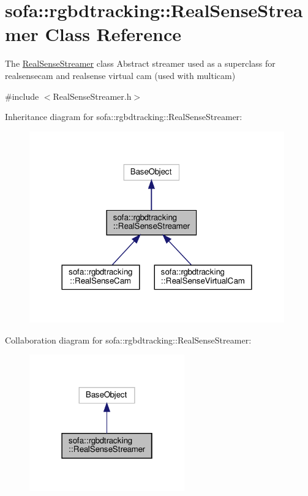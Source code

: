 \hypertarget{classsofa_1_1rgbdtracking_1_1_real_sense_streamer}{}\section{sofa\+:\+:rgbdtracking\+:\+:Real\+Sense\+Streamer Class Reference}
\label{classsofa_1_1rgbdtracking_1_1_real_sense_streamer}


The \hyperlink{classsofa_1_1rgbdtracking_1_1_real_sense_streamer}{Real\+Sense\+Streamer} class Abstract streamer used as a superclass for realsensecam and realsense virtual cam (used with multicam)  




{\ttfamily \#include $<$Real\+Sense\+Streamer.\+h$>$}



Inheritance diagram for sofa\+:\+:rgbdtracking\+:\+:Real\+Sense\+Streamer\+:
\nopagebreak
\begin{figure}[H]
\begin{center}
\leavevmode
\includegraphics[width=312pt]{classsofa_1_1rgbdtracking_1_1_real_sense_streamer__inherit__graph}
\end{center}
\end{figure}


Collaboration diagram for sofa\+:\+:rgbdtracking\+:\+:Real\+Sense\+Streamer\+:
\nopagebreak
\begin{figure}[H]
\begin{center}
\leavevmode
\includegraphics[width=190pt]{classsofa_1_1rgbdtracking_1_1_real_sense_streamer__coll__graph}
\end{center}
\end{figure}
